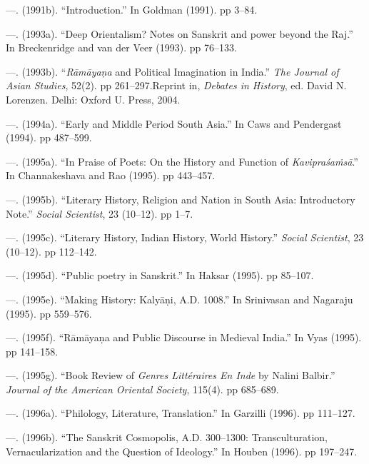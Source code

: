 \begin{thebibliography}{99}
 \item —. (1991b). “Introduction.” In Goldman (1991). pp 3–84.

 \item —. (1993a). “Deep Orientalism? Notes on Sanskrit and power beyond the Raj.” In Breckenridge and van der Veer (1993). pp 76–133.

 \item —. (1993b). “\textit{Rāmāyaṇa} and Political Imagination in India.” \textit{The Journal of Asian Studies}, 52(2). pp 261–297.Reprint in, \textit{Debates in History}, ed. David N. Lorenzen. Delhi: Oxford U. Press, 2004.

 \item —. (1994a). “Early and Middle Period South Asia.” In Caws and Pendergast (1994). pp 487–599.

 \item —. (1995a). “In Praise of Poets: On the History and Function of \textit{Kavipraśaṁsā}.” In Channakeshava and Rao (1995). pp 443–457.

 \item —. (1995b). “Literary History, Religion and Nation in South Asia: Introductory Note.” \textit{Social Scientist}, 23 (10–12). pp 1–7.

 \item —. (1995c). “Literary History, Indian History, World History.” \textit{Social Scientist}, 23 (10–12). pp 112–142.

 \item —. (1995d). “Public poetry in Sanskrit.” In Haksar (1995). pp 85–107.

 \item —. (1995e). “Making History: Kalyāṇi, A.D. 1008.” In Srinivasan and Nagaraju (1995). pp 559–576.

 \item —. (1995f). “Rāmāyaṇa and Public Discourse in Medieval India.” In Vyas (1995). pp 141–158.

 \item —. (1995g). “Book Review of \textit{Genres Littéraires En Inde} by Nalini Balbir.” \textit{Journal of the American Oriental Society}, 115(4). pp 685–689.

 \item —. (1996a). “Philology, Literature, Translation.” In Garzilli (1996). pp 111–127.

 \item —. (1996b). “The Sanskrit Cosmopolis, A.D. 300–1300: Transculturation, Vernacularization and the Question of Ideology.” In Houben (1996). pp 197–247.


\end{thebibliography}
